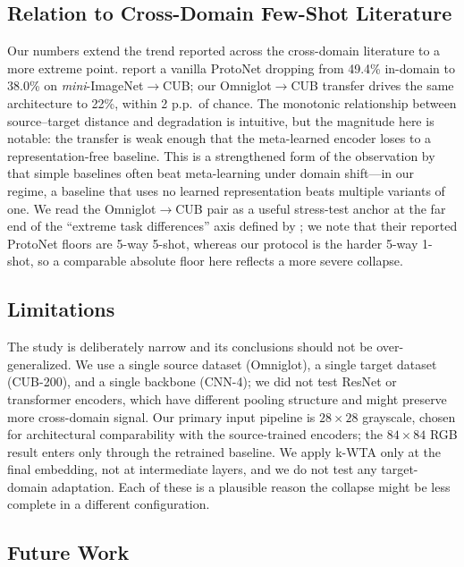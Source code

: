 \documentclass[11pt]{article}
\begin{document}
\subsection{Relation to Cross-Domain Few-Shot Literature}
\label{subsec:lit-comparison}

Our numbers extend the trend reported across the cross-domain literature to a more extreme point. \citet{tseng2020cross} report a vanilla ProtoNet dropping from 49.4\% in-domain to 38.0\% on \emph{mini}-ImageNet$\to$CUB; our Omniglot$\to$CUB transfer drives the same architecture to 22\%, within 2 p.p.\ of chance. The monotonic relationship between source--target distance and degradation is intuitive, but the magnitude here is notable: the transfer is weak enough that the meta-learned encoder loses to a representation-free baseline. This is a strengthened form of the observation by \citet{chen2019closer} that simple baselines often beat meta-learning under domain shift---in our regime, a baseline that uses no learned representation beats multiple variants of one. We read the Omniglot$\to$CUB pair as a useful stress-test anchor at the far end of the ``extreme task differences'' axis defined by \citet{phoo2021self}; we note that their reported ProtoNet floors are 5-way 5-shot, whereas our protocol is the harder 5-way 1-shot, so a comparable absolute floor here reflects a more severe collapse.

\subsection{Limitations}
\label{subsec:limitations}

The study is deliberately narrow and its conclusions should not be over-generalized. We use a single source dataset (Omniglot), a single target dataset (CUB-200), and a single backbone (CNN-4); we did not test ResNet or transformer encoders, which have different pooling structure and might preserve more cross-domain signal. Our primary input pipeline is $28 \times 28$ grayscale, chosen for architectural comparability with the source-trained encoders; the $84 \times 84$ RGB result enters only through the retrained baseline. We apply k-WTA only at the final embedding, not at intermediate layers, and we do not test any target-domain adaptation. Each of these is a plausible reason the collapse might be less complete in a different configuration.

\subsection{Future Work}
\label{subsec:future-work}
\end{document}
